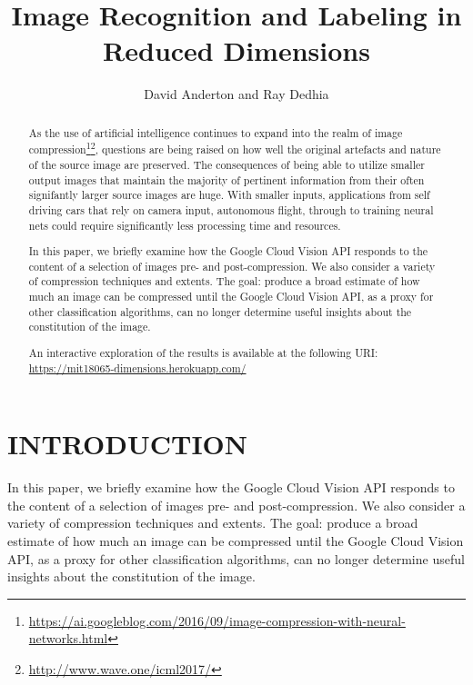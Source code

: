 \documentclass[letterpaper, 12 pt, conference]{ieeeconf}  %
\title{\LARGE \bf Image Recognition and Labeling in Reduced Dimensions}
\author{David Anderton and Ray Dedhia}
\begin{document}
\maketitle
\thispagestyle{empty}
\pagestyle{empty}



\begin{abstract}

As the use of artificial intelligence continues to expand into the realm of image compression\footnote{\url{https://ai.googleblog.com/2016/09/image-compression-with-neural-networks.html}}\footnote{\url{http://www.wave.one/icml2017/}}, questions are being raised on how well the original artefacts and nature of the source image are preserved. The consequences of being able to utilize smaller output images that maintain the majority of pertinent information from their often signifantly larger source images are huge. With smaller inputs, applications from self driving cars that rely on camera input, autonomous flight, through to training neural nets could require significantly less processing time and resources.

In this paper, we briefly examine how the Google Cloud Vision API responds to the content of a selection of images pre- and post-compression. We also consider a variety of compression techniques and extents. The goal: produce a broad estimate of how much an image can be compressed until the Google Cloud Vision API, as a proxy for other classification algorithms, can no longer determine useful insights about the constitution of the image.

An interactive exploration of the results is available at the following URI: \url{https://mit18065-dimensions.herokuapp.com/}

\end{abstract}

\section{INTRODUCTION}

In this paper, we briefly examine how the Google Cloud Vision API responds to the content of a selection of images pre- and post-compression. We also consider a variety of compression techniques and extents. The goal: produce a broad estimate of how much an image can be compressed until the Google Cloud Vision API, as a proxy for other classification algorithms, can no longer determine useful insights about the constitution of the image.
\end{document}
